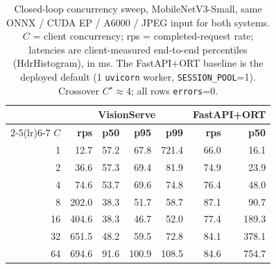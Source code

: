 \begin{table}[t]
  \centering
  \small
  \setlength{\tabcolsep}{3pt}
  \caption{%
    Closed-loop concurrency sweep, MobileNetV3-Small, same ONNX / CUDA EP / A6000 /
    JPEG input for both systems.  $C$ = client concurrency; rps = completed-request
    rate; latencies are client-measured end-to-end percentiles (HdrHistogram), in ms.
    The FastAPI+ORT baseline is the deployed default (1 \texttt{uvicorn} worker,
    \texttt{SESSION\_POOL}=1).  Crossover $C^\star\!\approx\!4$; all rows
    \texttt{errors}=0.%
  }
  \label{tab:crossover}
  \begin{tabular}{rrrrrrr}
    \toprule
    & \multicolumn{4}{c}{\textbf{VisionServe}} & \multicolumn{2}{c}{\textbf{FastAPI+ORT}} \\
    \cmidrule(lr){2-5}\cmidrule(lr){6-7}
    \textbf{$C$} & \textbf{rps} & \textbf{p50} & \textbf{p95} & \textbf{p99}
      & \textbf{rps} & \textbf{p50} \\
    \midrule
    1  & 12.7  & 57.2 & 67.8 & 721.4 & 66.0 & 16.1 \\
    2  & 36.6  & 57.3 & 69.4 & 81.9  & 74.9 & 23.9 \\
    4  & 74.6  & 53.7 & 69.6 & 74.8  & 76.4 & 48.0 \\
    8  & 202.0 & 38.3 & 51.7 & 58.7  & 87.1 & 90.7 \\
    16 & 404.6 & 38.3 & 46.7 & 52.0  & 77.4 & 189.3 \\
    32 & 651.5 & 48.2 & 59.5 & 72.8  & 84.1 & 378.1 \\
    64 & 694.6 & 91.6 & 100.9 & 108.5 & 84.6 & 754.7 \\
    \bottomrule
  \end{tabular}
\end{table}

